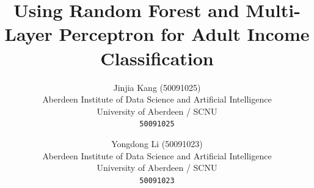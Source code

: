 \documentclass[10pt,twocolumn,letterpaper]{article}
\title{Using Random Forest and Multi-Layer Perceptron for Adult Income Classification}
\author{
Jinjia Kang (50091025)\\
Aberdeen Institute of Data Science and Artificial Intelligence\\
University of Aberdeen / SCNU\\
{\tt\small 50091025}
\and
Yongdong Li (50091023)\\
Aberdeen Institute of Data Science and Artificial Intelligence\\
University of Aberdeen / SCNU\\
{\tt\small 50091023}
}
\begin{document}
\maketitle







{
    \small
    
    
}
\end{document}
